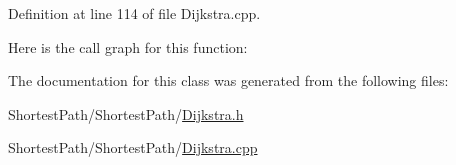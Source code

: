 Definition at line 114 of file Dijkstra.\+cpp.



Here is the call graph for this function\+:




The documentation for this class was generated from the following files\+:\begin{DoxyCompactItemize}
\item 
Shortest\+Path/\+Shortest\+Path/\hyperlink{_dijkstra_8h}{Dijkstra.\+h}\item 
Shortest\+Path/\+Shortest\+Path/\hyperlink{_dijkstra_8cpp}{Dijkstra.\+cpp}\end{DoxyCompactItemize}
